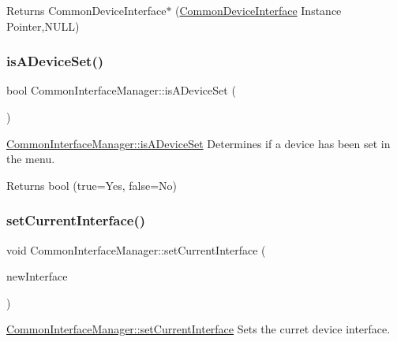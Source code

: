 \begin{DoxyReturn}{Returns}
Common\+Device\+Interface$\ast$ (\hyperlink{class_common_device_interface}{Common\+Device\+Interface} Instance Pointer,N\+U\+LL) 
\end{DoxyReturn}
\hypertarget{class_common_interface_manager_abd7a314803309cdb6789eaf36f90b7b7}{}\label{class_common_interface_manager_abd7a314803309cdb6789eaf36f90b7b7} 
\subsubsection{\texorpdfstring{is\+A\+Device\+Set()}{isADeviceSet()}}
{\footnotesize\ttfamily bool Common\+Interface\+Manager\+::is\+A\+Device\+Set (\begin{DoxyParamCaption}{ }\end{DoxyParamCaption})}



\hyperlink{class_common_interface_manager_abd7a314803309cdb6789eaf36f90b7b7}{Common\+Interface\+Manager\+::is\+A\+Device\+Set} Determines if a device has been set in the menu. 

\begin{DoxyReturn}{Returns}
bool (true=Yes, false=No) 
\end{DoxyReturn}
\hypertarget{class_common_interface_manager_add704853a060d8cca441da322b748c19}{}\label{class_common_interface_manager_add704853a060d8cca441da322b748c19} 
\subsubsection{\texorpdfstring{set\+Current\+Interface()}{setCurrentInterface()}}
{\footnotesize\ttfamily void Common\+Interface\+Manager\+::set\+Current\+Interface (\begin{DoxyParamCaption}\item[{\hyperlink{class_common_device_interface}{Common\+Device\+Interface} $\ast$}]{new\+Interface }\end{DoxyParamCaption})}



\hyperlink{class_common_interface_manager_add704853a060d8cca441da322b748c19}{Common\+Interface\+Manager\+::set\+Current\+Interface} Sets the curret device interface. 


